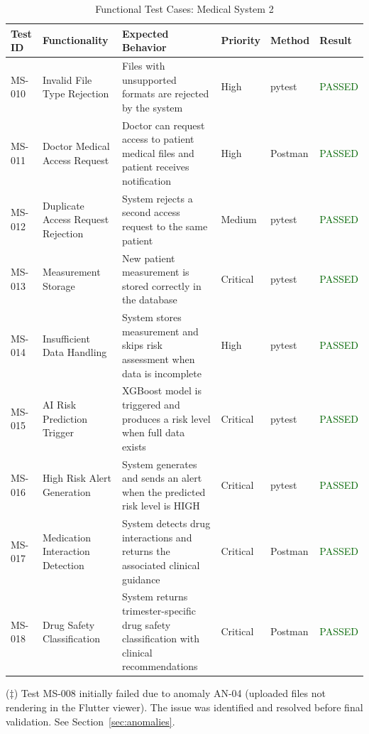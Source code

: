 \begin{table}[ht!]
\centering
\caption{Functional Test Cases: Medical System 2}
\renewcommand{\arraystretch}{1.4}
\begin{tabular}{|p{1.6cm}|p{3cm}|p{3.8cm}|p{1.6cm}|p{1.6cm}|p{1.8cm}|}
\hline
\textbf{Test ID} & \textbf{Functionality} & \textbf{Expected Behavior} & \textbf{Priority} & \textbf{Method} & \textbf{Result} \\
\hline
MS-010 & Invalid File Type Rejection & Files with unsupported formats are rejected by the system & High & pytest & \textcolor{darkgreen}{PASSED} \\
\hline
MS-011 & Doctor Medical Access Request & Doctor can request access to patient medical files and patient receives notification & High & Postman & \textcolor{darkgreen}{PASSED} \\
\hline
MS-012 & Duplicate Access Request Rejection & System rejects a second access request to the same patient & Medium & pytest & \textcolor{darkgreen}{PASSED} \\
\hline
MS-013 & Measurement Storage & New patient measurement is stored correctly in the database & Critical & pytest & \textcolor{darkgreen}{PASSED} \\
\hline
MS-014 & Insufficient Data Handling & System stores measurement and skips risk assessment when data is incomplete & High & pytest & \textcolor{darkgreen}{PASSED} \\
\hline
MS-015 & AI Risk Prediction Trigger & XGBoost model is triggered and produces a risk level when full data exists & Critical & pytest & \textcolor{darkgreen}{PASSED} \\
\hline
MS-016 & High Risk Alert Generation & System generates and sends an alert when the predicted risk level is HIGH & Critical & pytest & \textcolor{darkgreen}{PASSED} \\
\hline
MS-017 & Medication Interaction Detection & System detects drug interactions and returns the associated clinical guidance & Critical & Postman & \textcolor{darkgreen}{PASSED} \\
\hline
MS-018 & Drug Safety Classification & System returns trimester-specific drug safety classification with clinical recommendations & Critical & Postman & \textcolor{darkgreen}{PASSED}  \\\hline
\end{tabular}
\end{table}

($\ddagger$) Test MS-008 initially failed due to anomaly AN-04 (uploaded files not rendering in the Flutter viewer). The issue was identified and resolved before final validation. See Section~\ref{sec:anomalies}.


